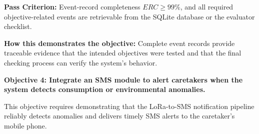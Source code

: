 \begin{itemize}
    \textbf{Pass Criterion:} Event-record completeness $ERC \geq 99\%$, and all required objective-related events are retrievable from the SQLite database or the evaluator checklist.

    \textbf{How this demonstrates the objective:} Complete event records provide traceable evidence that the intended objectives were tested and that the final checking process can verify the system's behavior.
\end{itemize}

\textbf{Objective 4: Integrate an SMS module to alert caretakers when the system detects consumption or environmental anomalies.}

This objective requires demonstrating that the LoRa-to-SMS notification pipeline reliably detects anomalies and delivers timely SMS alerts to the caretaker's mobile phone.

